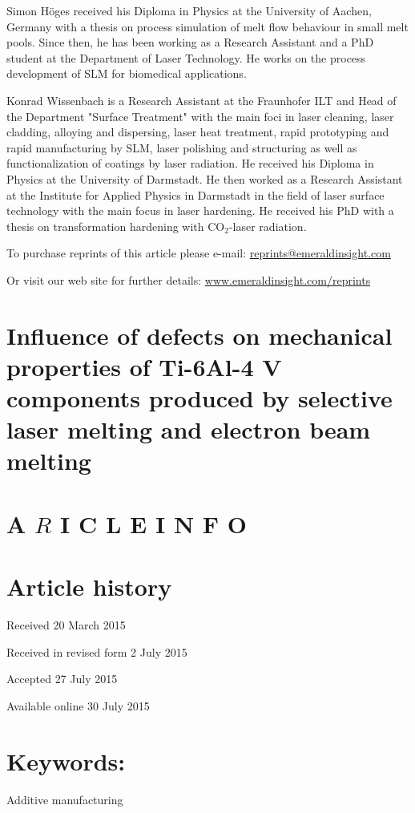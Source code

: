 \documentclass[10pt]{article}
\begin{document}
Simon Höges received his Diploma in Physics at the University of Aachen, Germany with a thesis on process simulation of melt flow behaviour in small melt pools. Since then, he has been working as a Research Assistant and a PhD student at the Department of Laser Technology. He works on the process development of SLM for biomedical applications.

Konrad Wissenbach is a Research Assistant at the Fraunhofer ILT and Head of the Department "Surface Treatment" with the main foci in laser cleaning, laser cladding, alloying and dispersing, laser heat treatment, rapid prototyping and rapid manufacturing by SLM, laser polishing and structuring as well as functionalization of coatings by laser radiation. He received his Diploma in Physics at the University of Darmstadt. He then worked as a Research Assistant at the Institute for Applied Physics in Darmstadt in the field of laser surface technology with the main focus in laser hardening. He received his $\mathrm{PhD}$ with a thesis on transformation hardening with $\mathrm{CO}_{2}$-laser radiation.

To purchase reprints of this article please e-mail: \href{mailto:reprints@emeraldinsight.com}{reprints@emeraldinsight.com}

Or visit our web site for further details: \href{http://www.emeraldinsight.com/reprints}{www.emeraldinsight.com/reprints}

\section*{Influence of defects on mechanical properties of Ti-6Al-4 V components produced by selective laser melting and electron beam melting }


\section*{A $R$ I C L E I N F O}
\section*{Article history}
Received 20 March 2015

Received in revised form 2 July 2015

Accepted 27 July 2015

Available online 30 July 2015

\section*{Keywords:}
Additive manufacturing
\end{document}

